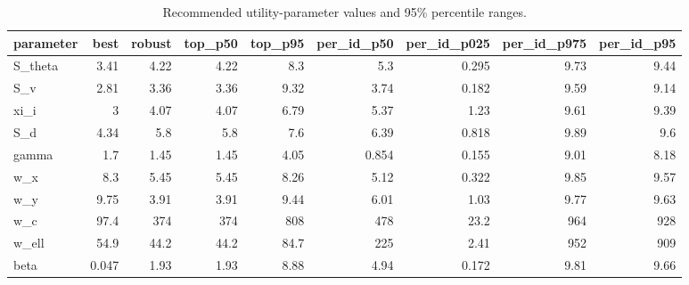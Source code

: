 \begin{table}[t]
\centering
\caption{Recommended utility-parameter values and 95\% percentile ranges.}
\label{tab:utility_recommended_ranges}
\begin{tabular}{lrrrrrrrr}
\toprule
parameter & best & robust & top\_p50 & top\_p95 & per\_id\_p50 & per\_id\_p025 & per\_id\_p975 & per\_id\_p95 \\
\midrule
S\_theta & 3.41 & 4.22 & 4.22 & 8.3 & 5.3 & 0.295 & 9.73 & 9.44 \\
S\_v & 2.81 & 3.36 & 3.36 & 9.32 & 3.74 & 0.182 & 9.59 & 9.14 \\
xi\_i & 3 & 4.07 & 4.07 & 6.79 & 5.37 & 1.23 & 9.61 & 9.39 \\
S\_d & 4.34 & 5.8 & 5.8 & 7.6 & 6.39 & 0.818 & 9.89 & 9.6 \\
gamma & 1.7 & 1.45 & 1.45 & 4.05 & 0.854 & 0.155 & 9.01 & 8.18 \\
w\_x & 8.3 & 5.45 & 5.45 & 8.26 & 5.12 & 0.322 & 9.85 & 9.57 \\
w\_y & 9.75 & 3.91 & 3.91 & 9.44 & 6.01 & 1.03 & 9.77 & 9.63 \\
w\_c & 97.4 & 374 & 374 & 808 & 478 & 23.2 & 964 & 928 \\
w\_ell & 54.9 & 44.2 & 44.2 & 84.7 & 225 & 2.41 & 952 & 909 \\
beta & 0.047 & 1.93 & 1.93 & 8.88 & 4.94 & 0.172 & 9.81 & 9.66 \\
\bottomrule
\end{tabular}
\end{table}
